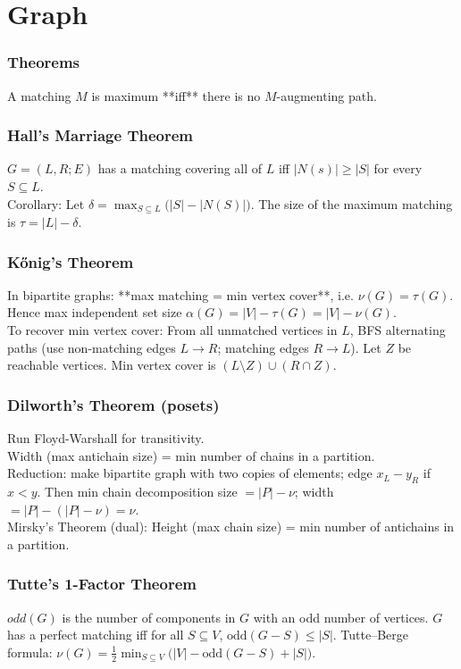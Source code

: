 \chapter{Graph}

\subsection{Theorems}

  	A matching $M$ is maximum **iff** there is no $M$-augmenting path.

	\subsection{Hall's Marriage Theorem}
		$G = (L, R; E)$ has a matching covering all of $L$ iff $|N(s)| \ge |S|$ for every $S \subseteq L$. \\
		Corollary: Let $\delta=\max_{S\subseteq L}\big(|S|-|N(S)|\big)$. The size of the maximum matching is $\tau = |L|-\delta$.

	\subsection{Kőnig's Theorem}
 		In bipartite graphs: **max matching = min vertex cover**, i.e. $\nu(G)=\tau(G)$.
		Hence max independent set size $\alpha(G)=|V|-\tau(G)=|V|-\nu(G)$. \\

		To recover min vertex cover: 
		From all unmatched vertices in $L$, BFS alternating paths (use non-matching edges $L\!\to\!R$; matching edges $R\!\to\!L$).
		Let $Z$ be reachable vertices. Min vertex cover is $(L\setminus Z)\cup(R\cap Z)$.

	\subsection{Dilworth's Theorem (posets)}
		Run Floyd-Warshall for transitivity. \\
		Width (max antichain size) = min number of chains in a partition. \\
		Reduction: make bipartite graph with two copies of elements; edge $x_L\!-\!y_R$ if $x<y$. Then
		min chain decomposition size $= |P|-\nu$; width $= |P|-(|P|-\nu)=\nu$. \\
		Mirsky’s Theorem (dual): Height (max chain size) = min number of antichains in a partition.

	\subsection{Tutte’s 1-Factor Theorem}
		$odd(G)$ is the number of components in $G$ with an odd number of vertices. 
		$G$ has a perfect matching iff for all $S\subseteq V$, $\text{odd}(G-S)\le |S|$.
		Tutte–Berge formula: $\displaystyle \nu(G)=\tfrac12\min_{S\subseteq V}\big(|V|-\text{odd}(G-S)+|S|\big)$.

